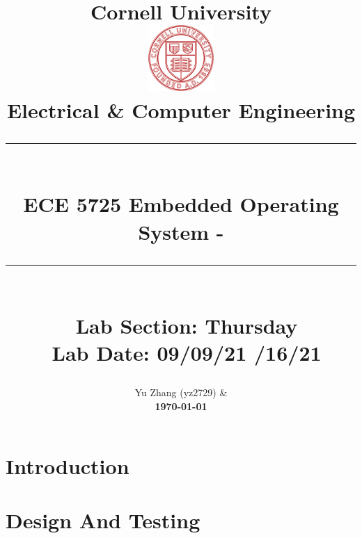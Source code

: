 \documentclass[11pt]{report}
\newcommand{\HRule}[1]{\rule{\linewidth}{#1}}
\begin{document}
\date{}

\title{ \normalsize {\textbf{Cornell University}}
		\\ [1.0cm]
		\includegraphics[width=25mm]{img/cornell_logo.png}\\[.5cm]
		Electrical & Computer Engineering\\
		\HRule{2pt} \\
		\LARGE \textbf{ ECE 5725 Embedded Operating System - {}} %
		\HRule{2pt} \\ [0.5cm]
		\normalsize \ {Lab Section: Thursday} \\
		\normalsize \ {Lab Date: 09/09/21 /16/21} \vspace*{5\baselineskip}\\
		}
		
\author{
		{Yu Zhang (yz2729)} \quad \&  \\[5cm]
		\large {\textbf{\today} } 
		}
		

\maketitle




\section*{Introduction}



\section*{Design And Testing}
\end{document}
